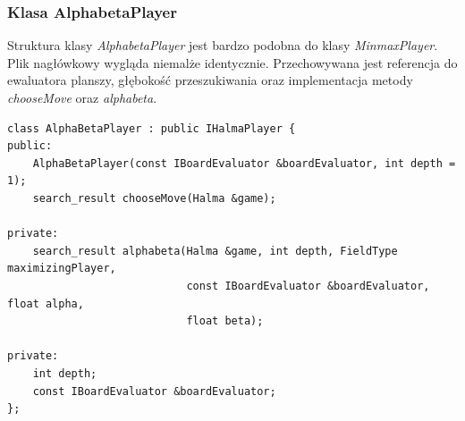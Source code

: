 \documentclass[a4paper, 12pt]{article}
\begin{document}
\subsubsection{Klasa AlphabetaPlayer}
Struktura klasy \textit{AlphabetaPlayer} jest bardzo podobna do klasy \textit{MinmaxPlayer}.
Plik nagłówkowy wygląda niemalże identycznie. Przechowywana jest referencja do ewaluatora planszy, 
głębokość przeszukiwania oraz implementacja metody \textit{chooseMove} oraz \textit{alphabeta}.
\begin{lstlisting}
class AlphaBetaPlayer : public IHalmaPlayer {
public:
    AlphaBetaPlayer(const IBoardEvaluator &boardEvaluator, int depth = 1);
    search_result chooseMove(Halma &game);

private:
    search_result alphabeta(Halma &game, int depth, FieldType maximizingPlayer,
                            const IBoardEvaluator &boardEvaluator, float alpha,
                            float beta);

private:
    int depth;
    const IBoardEvaluator &boardEvaluator;
};
\end{lstlisting}
\end{document}
